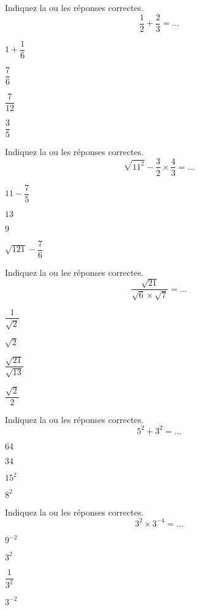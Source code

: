 

\def\Classe{2\textsuperscript{nde}}
\def\Titre{Calcul numérique et algébrique}



\begin{qcm}

	\q{} Indiquez la ou les réponses correctes. $$ \dfrac{1}{2}+\dfrac{2}{3}=...$$
	\begin{choix2col}
		\item $1+\dfrac{1}{6}$
		\item $\dfrac{7}{6}$
		\item $\dfrac{7}{12}$
		\item $\dfrac{3}{5}$
	\end{choix2col}

	\q{} Indiquez la ou les réponses correctes. $$ \sqrt{11^2}-\dfrac{3}{2}\times\dfrac{4}{3}=...$$
	\begin{choix2col}
		\item $11-\dfrac{7}{5}$
		\item $13$
		\item $9$
		\item $\sqrt{121}-\dfrac{7}{6}$
	\end{choix2col}

	\q{} Indiquez la ou les réponses correctes. $$\dfrac{\sqrt{21}}{\sqrt{6}\times\sqrt{7}}=...$$
	\begin{choix2col}
		\item $\dfrac{1}{\sqrt{2}}$
		\item $\sqrt{2}$
		\item $\dfrac{\sqrt{21}}{\sqrt{13}}$
		\item $\dfrac{\sqrt{2}}{2}$
	\end{choix2col}

	\q{} Indiquez la ou les réponses correctes. $$5^2+3^2=...$$
	\begin{choix2col}
		\item $64$
		\item $34$
		\item $15^2$
		\item $8^2$
	\end{choix2col}

	\q{} Indiquez la ou les réponses correctes. $$3^2\times3^{-4}=...$$
	\begin{choix2col}
		\item $9^{-2}$
		\item $3^2$
		\item $\dfrac{1}{3^2}$
		\item $3^{-2}$
	\end{choix2col}


\end{qcm}
